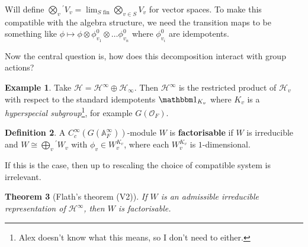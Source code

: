 \documentclass[11pt]{report}
\let\mbb\mathbb
\let\mc\mathcal
\newcommand{\1}{\mathbbm 1}
\newcommand{\A}{\mbb A}
\renewcommand{\O}{\mc O}
\theoremstyle{plain}
\newtheorem{thm}{Theorem}[section]
\newcounter{ex}
\theoremstyle{definition}
\newtheorem{mydef}[thm]{Definition}
\newtheorem{example}[thm]{Example}
\theoremstyle{remark}
\numberwithin{equation}{section}
\begin{document}
Will define
$\bigotimes_{v} {}^{'} V_{v} = \lim_{S \text{ fin}} \bigotimes_{v \in
  S}V_{v}$ for vector spaces. To make this compatible with the algebra structure, we
need the transition maps to be something like
$\phi \mapsto \phi \otimes \phi_{v_{1}}^{0}\otimes \ldots \phi_{v_{n}}^{0}$ where
$\phi_{v_{i}}^{0}$ are idempotents.

Now the central question is, how does this decomposition interact with
group actions?

\begin{example}
Take $\mc H = \mc H^{\infty} \oplus \mc H_{\infty}$. Then $\mc H^{\infty}$ is the
restricted product of $\mc H_{v}$ with respect to the standard
idempotents $\1_{K_{v}}$ where $K_{v}$ is a \emph{hyperspecial
  subgroup}\footnote{Alex doesn't know what this means, so I don't
  need to either.}, for example $G(\O_{F})$.
\end{example}


\begin{mydef}
  A $C_{c}^{\infty}(G(\A^{\infty}_{F}))$-module $W$ is \textbf{factorisable} if
  $W$ is irreducible and $W \cong \bigoplus_{v}{}^{'} W_{v}$ with
  $\phi_{v} \in W_{v}^{K_{v}}$, where each $W_{v}^{K_{v}}$ is
  $1$-dimensional.
\end{mydef}

If this is the case, then up to rescaling the choice of compatible
system is irrelevant.

\begin{thm}[Flath's theorem (V2)]
  If $W$   is an admissible irreducible representation of $\mc H^{\infty}$,
  then $W$ is factorisable. 
\end{thm}
\end{document}
